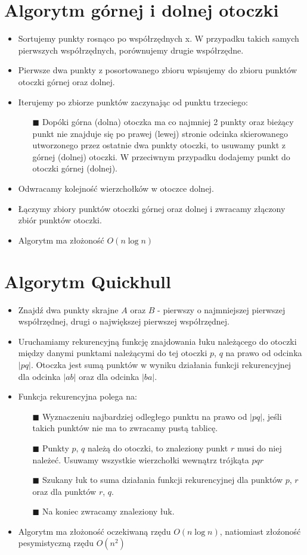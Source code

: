 \documentclass[12pt]{article}
\begin{document}
\section{Algorytm górnej i dolnej otoczki}
\begin{itemize}
\item Sortujemy punkty rosnąco po współrzędnych x. W przypadku takich samych pierwszych współrzędnych, porównujemy drugie współrzędne.
\item Pierwsze dwa punkty z posortowanego zbioru wpisujemy do zbioru punktów otoczki górnej oraz dolnej.
\item Iterujemy po zbiorze punktów zaczynając od punktu trzeciego:
\begin{itemize}
\item[$\blacksquare$] Dopóki górna (dolna) otoczka ma co najmniej 2 punkty oraz bieżący punkt nie znajduje się po prawej (lewej) stronie odcinka skierowanego utworzonego przez ostatnie dwa punkty otoczki, to usuwamy punkt z górnej (dolnej) otoczki. W przeciwnym przypadku dodajemy punkt do otoczki górnej (dolnej).
\end{itemize}
\item Odwracamy kolejność wierzchołków w otoczce dolnej.
\item Łączymy zbiory punktów otoczki górnej oraz dolnej i zwracamy złączony zbiór punktów otoczki.
\item Algorytm ma złożoność $O(n\log n)$
\end{itemize}
\newpage
\section{Algorytm Quickhull}
\begin{itemize}
\item Znajdź dwa punkty skrajne $A$ oraz $B$ - pierwszy o najmniejszej pierwszej współrzędnej, drugi o największej pierwszej współrzędnej.
\item Uruchamiamy rekurencyjną funkcję znajdowania łuku należącego do otoczki między danymi punktami należącymi do tej otoczki $p$, $q$ na prawo od odcinka $\left | p q \right | $. Otoczka jest sumą punktów w wyniku działania funkcji rekurencyjnej dla odcinka $\left | a b \right | $ oraz dla odcinka $\left | b a \right | $.
\item Funkcja rekurencyjna polega na:
\begin{itemize}
\item[$\blacksquare$] Wyznaczeniu najbardziej odległego punktu na prawo od $\left | p q \right | $, jeśli takich punktów nie ma to zwracamy pustą tablicę.
\item[$\blacksquare$] Punkty $p$, $q$ należą do otoczki, to znaleziony punkt $r$ musi do niej należeć. Usuwamy wszystkie wierzchołki wewnątrz trójkąta $pqr$
\item[$\blacksquare$] Szukany łuk to suma działania funkcji rekurencyjnej dla punktów $p$, $r$ oraz dla punktów $r$, $q$.
\item[$\blacksquare$] Na koniec zwracamy znaleziony łuk.
\end{itemize}
\item Algorytm ma złożoność oczekiwaną rzędu $O(n\log n)$, natiomiast złoźoność pesymistyczną rzędu $O(n^2)$
\end{itemize}
\end{document}
